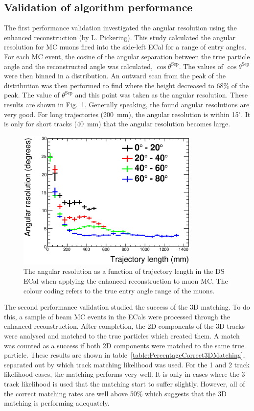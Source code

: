 \subsection{Validation of algorithm performance}
\label{subsec:ValidationOfAlgorithmPerformance}
The first performance validation investigated the angular resolution using the enhanced reconstruction (by L. Pickering).  This study calculated the angular resolution for MC muons fired into the side-left ECal for a range of entry angles.  For each MC event, the cosine of the angular separation between the true particle angle and the reconstructed angle was calculated, $\cos\theta^{\textrm{Sep}}$.  The values of $\cos\theta^{\textrm{Sep}}$ were then binned in a distribution.  An outward scan from the peak of the distribution was then performed to find where the height decreased to $68\%$ of the peak.  The value of $\theta^{\textrm{Sep}}$ and this point was taken as the angular resolution.  These results are shown in Fig.~\ref{fig:MuonAngularResolutionDSECal}.  Generally speaking, the found angular resolutions are very good.  For long trajectories (200~mm), the angular resolution is within 15$^\circ$.  It is only for short tracks (40~mm) that the angular resolution becomes large.
\begin{figure}
  \centering
  \includegraphics[width=9cm]{images/hough_validation/MuonAngularResolutionDSECal}
  \caption{The angular resolution as a function of trajectory length in the DS ECal when applying the enhanced reconstruction to muon MC.  The colour coding refers to the true entry angle range of the muons.}
  \label{fig:MuonAngularResolutionDSECal}
\end{figure}
\newline
\newline
The second performance validation studied the success of the 3D matching.  To do this, a sample of beam MC events in the ECals were processed through the enhanced reconstruction.  After completion, the 2D components of the 3D tracks were analysed and matched to the true particles which created them.  A match was counted as a success if both 2D components were matched to the same true particle.  These results are shown in table~\ref{table:PercentageCorrect3DMatching}, separated out by which track matching likelihood was used.  For the 1 and 2 track likelihood cases, the matching performs very well.  It is only in cases where the 3 track likelihood is used that the matching start to suffer slightly.  However, all of the correct matching rates are well above 50$\%$ which suggests that the 3D matching is performing adequately. 
